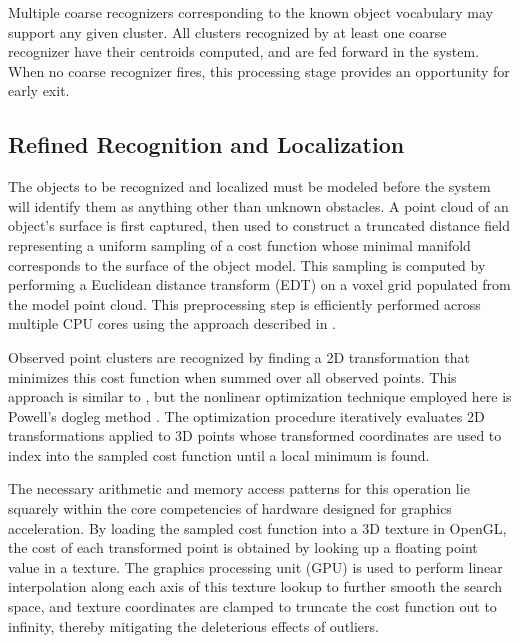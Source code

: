 \documentclass[letterpaper, 10 pt, conference]{ieeeconf}  %
\begin{document}
Multiple coarse recognizers corresponding to the known object
vocabulary may support any given cluster. All clusters recognized by
at least one coarse recognizer have their centroids computed, and are
fed forward in the system. When no coarse recognizer fires, this
processing stage provides an opportunity for early exit.

\subsection{Refined Recognition and Localization}
The objects to be recognized and localized must be modeled before the
system will identify them as anything other than unknown obstacles. A
point cloud of an object's surface is first captured, then used to
construct a truncated distance field representing a uniform sampling
of a cost function whose minimal manifold corresponds to the surface
of the object model. This sampling is computed by performing a
Euclidean distance transform (EDT) on a voxel grid populated from the
model point cloud. This preprocessing step is efficiently performed
across multiple CPU cores using the approach described in
\cite{Meijster2002}.

Observed point clusters are recognized by finding a 2D transformation
that minimizes this cost function when summed over all observed
points. This approach is similar to \cite{Papazov2011:Stochastic}, but
the nonlinear optimization technique employed here is Powell's dogleg
method \cite{Powell1964}. The optimization procedure iteratively
evaluates 2D transformations applied to 3D points whose transformed
coordinates are used to index into the sampled cost function until a
local minimum is found.


The necessary arithmetic and memory access patterns for this operation
lie squarely within the core competencies of hardware designed for
graphics acceleration. By loading the sampled cost function into a 3D
texture in OpenGL, the cost of each transformed point is obtained by
looking up a floating point value in a texture. The graphics
processing unit (GPU) is used to perform linear interpolation along
each axis of this texture lookup to further smooth the search space,
and texture coordinates are clamped to truncate the cost function out
to infinity, thereby mitigating the deleterious effects of outliers.
\end{document}
